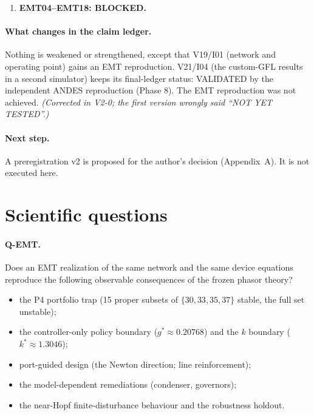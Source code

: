 \documentclass[10pt,a4paper]{article}
\begin{document}
\begin{enumerate}
\begin{itemize}
  \item With the preregistered EMT line, an undamped step-to-step (Nyquist)
    mode of the trapezoidal line inductance is amplified by the
    ideal-current-source converter.
  \item At $g=0$ the three runs go non-finite at 0.76\,s. At $g>0$ they stay
    finite but saturate at a 0.11\,pu alternation, giving state errors
    3--1100$\times$ the excursion.
  \item With the line realized algebraically (diagnostic only), all nine cases
    agree within 0.78\,\%.
  \end{itemize}
\item \textbf{EMT04--EMT18: BLOCKED.}
\end{enumerate}

\paragraph{What changes in the claim ledger.} Nothing is weakened or
strengthened, except that V19/I01 (network and operating point) gains an EMT
reproduction. V21/I04 (the custom-GFL results in a second simulator) keeps its
final-ledger status: VALIDATED by the independent ANDES reproduction (Phase 8).
The EMT reproduction was not achieved. \emph{(Corrected in V2-0; the first
version wrongly said ``NOT YET TESTED''.)}

\paragraph{Next step.} A preregistration v2 is proposed for the author's
decision (Appendix~A). It is not executed here.

\section{Scientific questions}

\paragraph{Q-EMT.} Does an EMT realization of the same network and the same
device equations reproduce the following observable consequences of the
frozen phasor theory?
\begin{itemize}
\item the P4 portfolio trap (15 proper subsets of $\{30,33,35,37\}$ stable,
  the full set unstable);
\item the controller-only policy boundary ($g^*\approx0.20768$) and the $k$
  boundary ($k^*\approx1.3046$);
\item port-guided design (the Newton direction; line reinforcement);
\item the model-dependent remediations (condenser, governors);
\item the near-Hopf finite-disturbance behaviour and the robustness holdout.
\end{itemize}
\end{document}
